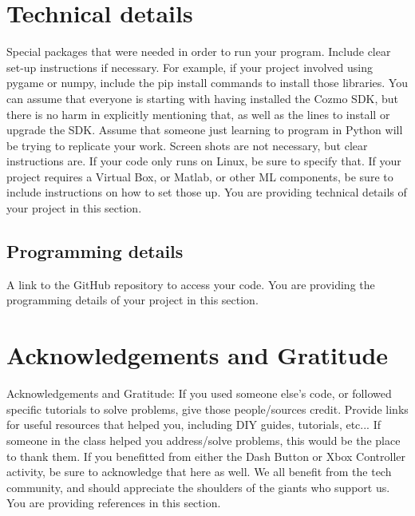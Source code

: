 \documentclass[12pt,a4paper]{article}
\begin{document}
\section{Technical details}
Special packages that were needed in order to run your program.  Include clear set-up instructions if necessary.  For example, if your project involved using pygame or numpy, include the pip install commands to install those libraries.  You can assume that everyone is starting with having installed the Cozmo SDK, but there is no harm in explicitly mentioning that, as well as the lines to install or upgrade the SDK.  Assume that someone just learning to program in Python will be trying to replicate your work.  Screen shots are not necessary, but clear instructions are.  If your code only runs on Linux, be sure to specify that.  If your project requires a Virtual Box, or Matlab, or other ML components, be sure to include instructions on how to set those up.  You are providing technical details of your project in this section.

\subsection{Programming details}

A link to the GitHub repository to access your code.  You are providing the programming details of your project in this section.

\section{Acknowledgements and Gratitude}

Acknowledgements and Gratitude: If you used someone else's code, or followed specific tutorials to solve problems, give those people/sources credit.  Provide links for useful resources that helped you, including DIY guides, tutorials, etc...  If someone in the class helped you address/solve problems, this would be the place to thank them.  If you benefitted from either the Dash Button or Xbox Controller activity, be sure to acknowledge that here as well.  We all benefit from the tech community, and should appreciate the shoulders of the giants who support us.  You are providing references in this section.





\end{document}
